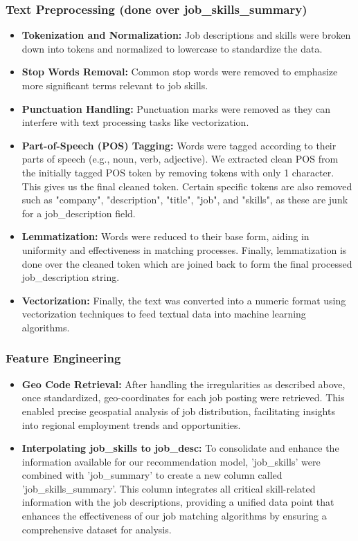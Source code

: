 \documentclass[a4paper,10pt]{article}
\begin{document}
    \subsubsection{Text Preprocessing (done over job\_skills\_summary)}
    \begin{itemize}
        \item \textbf{Tokenization and Normalization:} Job descriptions and skills were broken down into tokens and normalized to lowercase to standardize the data.
        \item \textbf{Stop Words Removal:} Common stop words were removed to emphasize more significant terms relevant to job skills.
        \item \textbf{Punctuation Handling:} Punctuation marks were removed as they can interfere with text processing tasks like vectorization.
        \item \textbf{Part-of-Speech (POS) Tagging:} Words were tagged according to their parts of speech (e.g., noun, verb, adjective). We extracted clean POS from the initially tagged POS token by removing tokens with only 1 character. This gives us the final cleaned token. Certain specific tokens are also removed such as "company", "description", "title", "job", and "skills", as these are junk for a job\_description field. 
        \item \textbf{Lemmatization:} Words were reduced to their base form, aiding in uniformity and effectiveness in matching processes. Finally, lemmatization is done over the cleaned token which are joined back to form the final processed job\_description string.
        \item \textbf{Vectorization:} Finally, the text was converted into a numeric format using vectorization techniques to feed textual data into machine learning algorithms.
    \end{itemize}
    
    \subsubsection{Feature Engineering}
    \begin{itemize}
        \item \textbf{Geo Code Retrieval:} After handling the irregularities as described above, once standardized, geo-coordinates for each job posting were retrieved. This enabled precise geospatial analysis of job distribution, facilitating insights into regional employment trends and opportunities.
        \item \textbf{Interpolating job\_skills to job\_desc:} To consolidate and enhance the information available for our recommendation model, 'job\_skills' were combined with 'job\_summary' to create a new column called 'job\_skills\_summary'. This column integrates all critical skill-related information with the job descriptions, providing a unified data point that enhances the effectiveness of our job matching algorithms by ensuring a comprehensive dataset for analysis.
    \end{itemize}
    
\end{document}
